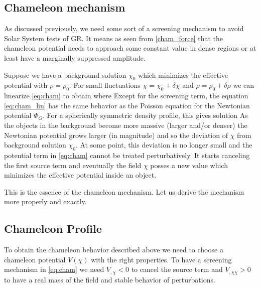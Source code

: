 \subsection{Chameleon mechanism}
As discussed previously, we need some sort of a screening mechanism to avoid Solar System tests of GR. It means as seen from \eqref{cham_force} that the chameleon potential needs to approach some constant value in dense regions or at least have a marginally suppressed amplitude.

Suppose we have a background solution $\chi_0$ which minimizes the effective potential with $\rho=\rho_0$. For small fluctuations $\chi=\chi_0+\delta\chi$ and $\rho=\rho_0+\delta\rho$ we can linearize \eqref{eq:cham} to obtain
where
Except for the screening term, the equation \eqref{eq:cham_lin} has the same behavior as the Poisson equation for the Newtonian potential $\Phi_G$. For a spherically symmetric density profile, this gives solution
As the objects in the background become more massive (larger and/or denser) the Newtonian potential grows larger (in magnitude) and so the deviation of $\chi$ from background solution $\chi_0$. At some point, this deviation is no longer small and the potential term in \eqref{eq:cham} cannot be treated perturbatively. It starts canceling the first source term and eventually the field $\chi$ posses a new value which minimizes the effective potential inside an object.

This is the essence of the chameleon mechanism. Let us derive the mechanism more properly and exactly. 
\subsection{Chameleon Profile}
\label{cham_prof}
To obtain the chameleon behavior described above we need to choose a chameleon potential $V(\chi)$ with the right properties. To have a screening mechanism in \eqref{eq:cham} we need $V_{,\chi}<0$ to cancel the source term and $V_{,\chi\chi}>0$ to have a real mass of the field and stable behavior of perturbations.

